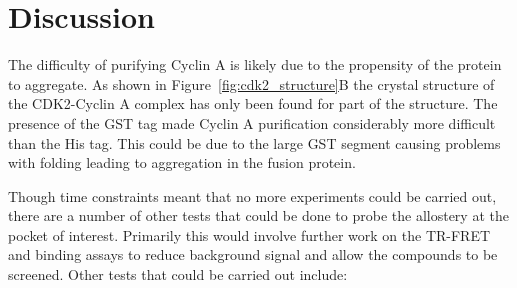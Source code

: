 \section{Discussion}

The difficulty of purifying Cyclin A is likely due to the propensity of the protein to aggregate.
As shown in Figure~\ref{fig:cdk2_structure}B the crystal structure of the CDK2-Cyclin A complex has only been found for part of the structure.
The presence of the GST tag made Cyclin A purification considerably more difficult than the His tag.
This could be due to the large GST segment causing problems with folding leading to aggregation in the fusion protein.

Though time constraints meant that no more experiments could be carried out, there are a number of other tests that could be done to probe the allostery at the pocket of interest.
Primarily this would involve further work on the TR-FRET and binding assays to reduce background signal and allow the compounds to be screened.
Other tests that could be carried out include:

